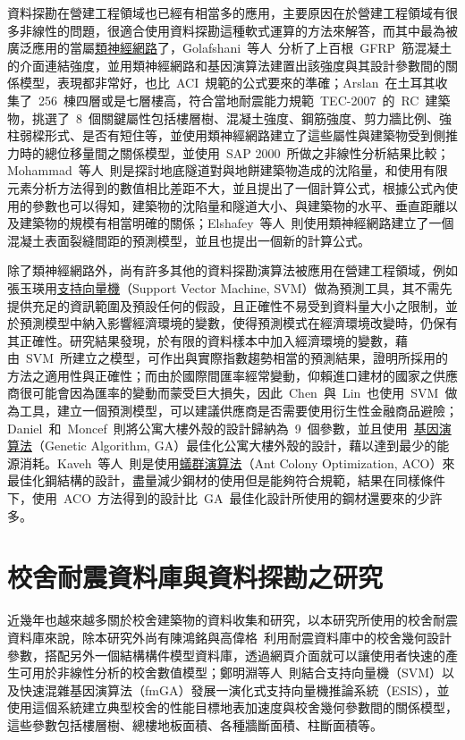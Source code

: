 資料探勘在營建工程領域也已經有相當多的應用，主要原因在於營建工程領域有很多非線性的問題，很適合使用資料探勘這種軟式運算的方法來解答，而其中最為被廣泛應用的當屬\underline{類神經網路}了，Golafshani~等人\cite{golafshani2014artificial}~分析了上百根~GFRP~筋混凝土的介面連結強度，並用類神經網路和基因演算法建置出該強度與其設計參數間的關係模型，表現都非常好，也比~ACI\cite{aci2006guide}~規範的公式要來的準確；Arslan\cite{arslan2010evaluation}~在土耳其收集了~256~棟四層或是七層樓高，符合當地耐震能力規範~TEC-2007~的~RC~建築物，挑選了~8~個關鍵屬性包括樓層樹、混凝土強度、鋼筋強度、剪力牆比例、強柱弱樑形式、是否有短住等，並使用類神經網路建立了這些屬性與建築物受到側推力時的總位移量間之關係模型，並使用~SAP 2000~所做之非線性分析結果比較；Mohammad~等人\cite{azadi2013assessment}~則是探討地底隧道對與地餅建築物造成的沈陷量，和使用有限元素分析方法得到的數值相比差距不大，並且提出了一個計算公式，根據公式內使用的參數也可以得知，建築物的沈陷量和隧道大小、與建築物的水平、垂直距離以及建築物的規模有相當明確的關係；Elshafey~等人\cite{elshafey2013predicting}~則使用類神經網路建立了一個混凝土表面裂縫間距的預測模型，並且也提出一個新的計算公式。

除了類神經網路外，尚有許多其他的資料探勘演算法被應用在營建工程領域，例如張玉瑛\cite{chang2007master}用\underline{支持向量機}（Support Vector Machine, SVM）做為預測工具，其不需先提供充足的資訊範圍及預設任何的假設，且正確性不易受到資料量大小之限制，並於預測模型中納入影響經濟環境的變數，使得預測模式在經濟環境改變時，仍保有其正確性。研究結果發現，於有限的資料樣本中加入經濟環境的變數，藉由~SVM~所建立之模型，可作出與實際指數趨勢相當的預測結果，證明所採用的方法之適用性與正確性；而由於國際間匯率經常變動，仰賴進口建材的國家之供應商很可能會因為匯率的變動而蒙受巨大損失，因此~Chen~與~Lin\cite{chen2010developing}~也使用~SVM~做為工具，建立一個預測模型，可以建議供應商是否需要使用衍生性金融商品避險；Daniel~和~Moncef\cite{tuhus2010genetic}~則將公寓大樓外殼的設計歸納為~9~個參數，並且使用~\underline{基因演算法}（Genetic Algorithm, GA）最佳化公寓大樓外殼的設計，藉以達到最少的能源消耗。Kaveh~等人\cite{kaveh2010performance}~則是使用\underline{蟻群演算法}（Ant Colony Optimization, ACO）來最佳化鋼結構的設計，盡量減少鋼材的使用但是能夠符合規範，結果在同樣條件下，使用~ACO~方法得到的設計比~GA~最佳化設計所使用的鋼材還要來的少許多。

\section{校舍耐震資料庫與資料探勘之研究}

近幾年也越來越多關於校舍建築物的資料收集和研究，以本研究所使用的校舍耐震資料庫來說，除本研究外尚有陳鴻銘與高偉格\cite{chen2008computer}~利用耐震資料庫中的校舍幾何設計參數，搭配另外一個結構構件模型資料庫，透過網頁介面就可以讓使用者快速的產生可用於非線性分析的校舍數值模型；鄭明淵等人\cite{chen2012seismic}~則結合支持向量機（SVM）以及快速混雜基因演算法（fmGA）發展一演化式支持向量機推論系統（ESIS），並使用這個系統建立典型校舍的性能目標地表加速度與校舍幾何參數間的關係模型，這些參數包括樓層樹、總樓地板面積、各種牆斷面積、柱斷面積等。


